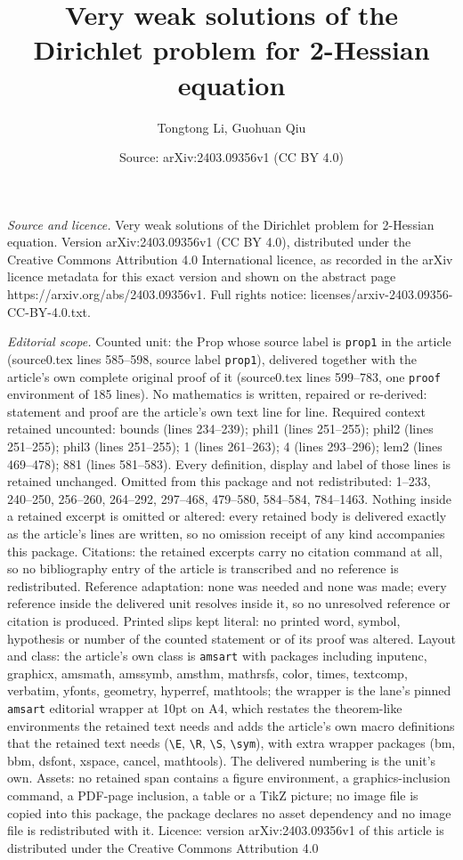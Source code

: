 \documentclass[10pt,a4paper]{amsart}
\title[Very weak solutions of the Dirichlet problem for 2-Hessian e]{Very weak solutions of the Dirichlet problem for 2-Hessian equation}
\author{Tongtong Li, Guohuan Qiu}
\date{Source: arXiv:2403.09356v1 (CC BY 4.0)}
\begin{document}
\maketitle

\noindent\emph{Source and licence.} Very weak solutions of the Dirichlet problem for 2-Hessian equation. Version arXiv:2403.09356v1 (CC BY 4.0), distributed under the Creative Commons Attribution 4.0 International licence, as recorded in the arXiv licence metadata for this exact version and shown on the abstract page https://arxiv.org/abs/2403.09356v1. Full rights notice: licenses/arxiv-2403.09356-CC-BY-4.0.txt.\par\smallskip

\noindent\textit{Editorial scope.} Counted unit: the Prop whose source label is \texttt{prop1} in the article (source0.tex lines 585--598, source label \texttt{prop1}), delivered together with the article's own complete original proof of it (source0.tex lines 599--783, one \texttt{proof} environment of 185 lines). No mathematics is written, repaired or re-derived: statement and proof are the article's own text line for line. Required context retained uncounted: bounds (lines 234--239); phil1 (lines 251--255); phil2 (lines 251--255); phil3 (lines 251--255); 1 (lines 261--263); 4 (lines 293--296); lem2 (lines 469--478); 881 (lines 581--583). Every definition, display and label of those lines is retained unchanged. Omitted from this package and not redistributed: 1--233, 240--250, 256--260, 264--292, 297--468, 479--580, 584--584, 784--1463. Nothing inside a retained excerpt is omitted or altered: every retained body is delivered exactly as the article's lines are written, so no omission receipt of any kind accompanies this package. Citations: the retained excerpts carry no citation command at all, so no bibliography entry of the article is transcribed and no reference is redistributed. Reference adaptation: none was needed and none was made; every reference inside the delivered unit resolves inside it, so no unresolved reference or citation is produced. Printed slips kept literal: no printed word, symbol, hypothesis or number of the counted statement or of its proof was altered. Layout and class: the article's own class is \texttt{amsart} with packages including inputenc, graphicx, amsmath, amssymb, amsthm, mathrsfs, color, times, textcomp, verbatim, yfonts, geometry, hyperref, mathtools; the wrapper is the lane's pinned \texttt{amsart} editorial wrapper at 10pt on A4, which restates the theorem-like environments the retained text needs and adds the article's own macro definitions that the retained text needs (\texttt{\textbackslash E}, \texttt{\textbackslash R}, \texttt{\textbackslash S}, \texttt{\textbackslash sym}), with extra wrapper packages (bm, bbm, dsfont, xspace, cancel, mathtools). The delivered numbering is the unit's own. Assets: no retained span contains a figure environment, a graphics-inclusion command, a PDF-page inclusion, a table or a TikZ picture; no image file is copied into this package, the package declares no asset dependency and no image file is redistributed with it. Licence: version arXiv:2403.09356v1 of this article is distributed under the Creative Commons Attribution 4.0 
\end{document}
